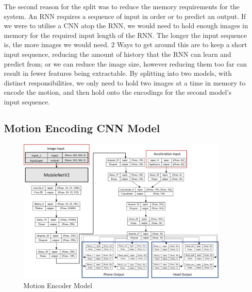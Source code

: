 The second reason  for the split was to reduce the memory requirements for the system.
An RNN requires a sequence of input in order or to predict an output. If we were to utilise a CNN atop the RNN, we would need to hold enough images in memory for the required input length of the RNN. The longer the input sequence is, the more images we would need. 2 Ways to get around this are to keep a short input sequence, reducing the amount of history that the RNN can learn and predict from; or we can reduce the image size, however reducing them too far can result in fewer features being extractable.
By splitting into two models, with distinct responsibilities, we only need to hold two images at a time in memory to encode the motion, and then hold onto the encodings for the second model's input sequence.

\subsection{Motion Encoding CNN Model}
\begin{figure}
    \centering
    \includegraphics[width=0.95\textwidth]{figures/TL_Model_Clean.png}
    \caption{\label{fig:motion_encoder} Motion Encoder Model}
\end{figure}
